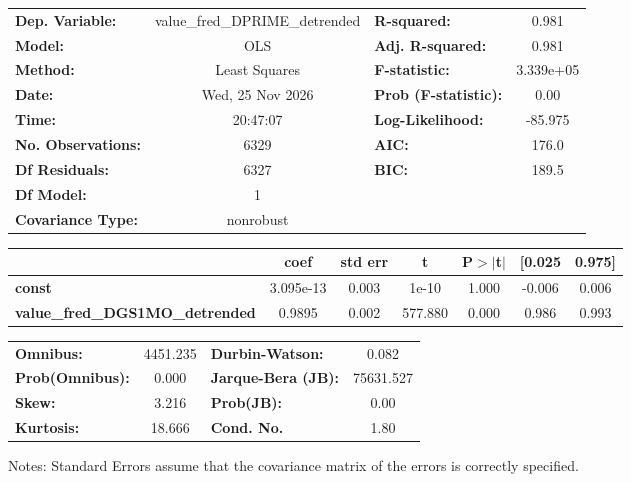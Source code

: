 \begin{center}
\begin{tabular}{lclc}
\toprule
\textbf{Dep. Variable:}                 & value\_fred\_DPRIME\_detrended & \textbf{  R-squared:         } &     0.981   \\
\textbf{Model:}                         &              OLS               & \textbf{  Adj. R-squared:    } &     0.981   \\
\textbf{Method:}                        &         Least Squares          & \textbf{  F-statistic:       } & 3.339e+05   \\
\textbf{Date:}                          &        Wed, 25 Nov 2026        & \textbf{  Prob (F-statistic):} &     0.00    \\
\textbf{Time:}                          &            20:47:07            & \textbf{  Log-Likelihood:    } &   -85.975   \\
\textbf{No. Observations:}              &               6329             & \textbf{  AIC:               } &     176.0   \\
\textbf{Df Residuals:}                  &               6327             & \textbf{  BIC:               } &     189.5   \\
\textbf{Df Model:}                      &                  1             & \textbf{                     } &             \\
\textbf{Covariance Type:}               &           nonrobust            & \textbf{                     } &             \\
\bottomrule
\end{tabular}
\begin{tabular}{lcccccc}
                                        & \textbf{coef} & \textbf{std err} & \textbf{t} & \textbf{P$> |$t$|$} & \textbf{[0.025} & \textbf{0.975]}  \\
\midrule
\textbf{const}                          &    3.095e-13  &        0.003     &     1e-10  &         1.000        &       -0.006    &        0.006     \\
\textbf{value\_fred\_DGS1MO\_detrended} &       0.9895  &        0.002     &   577.880  &         0.000        &        0.986    &        0.993     \\
\bottomrule
\end{tabular}
\begin{tabular}{lclc}
\textbf{Omnibus:}       & 4451.235 & \textbf{  Durbin-Watson:     } &     0.082  \\
\textbf{Prob(Omnibus):} &   0.000  & \textbf{  Jarque-Bera (JB):  } & 75631.527  \\
\textbf{Skew:}          &   3.216  & \textbf{  Prob(JB):          } &      0.00  \\
\textbf{Kurtosis:}      &  18.666  & \textbf{  Cond. No.          } &      1.80  \\
\bottomrule
\end{tabular}
\end{center}

Notes: \newline
 [1] Standard Errors assume that the covariance matrix of the errors is correctly specified.